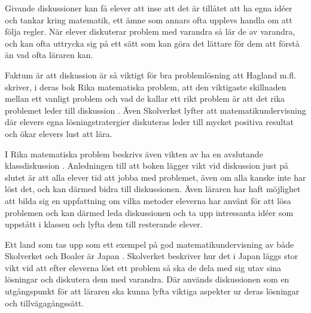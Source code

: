 \textcolor{turkos} {
Givande diskussioner kan få elever att inse att det är tillåtet att ha egna idéer och tankar kring matematik, ett ämne som annars ofta upplevs handla om att följa regler. När elever diskuterar problem med varandra så lär de av varandra, och kan ofta uttrycka sig på ett sätt som kan göra det lättare för dem att förstå än vad ofta läraren kan. \cite{TheElephant}
}

\textcolor{turkos} {Faktum är att diskussion är så viktigt för bra problemlösning att Hagland m.fl. skriver, i deras bok Rika matematiska problem, att den viktigaste skillnaden mellan ett vanligt problem och vad de kallar ett rikt problem är att det rika problemet leder till diskussion \cite{RikaProblem}. Även Skolverket lyfter att matematikundervisning där elevers egna lösningstratergier diskuteras leder till mycket positiva resultat och ökar elevers lust att lära\cite{Skolverket03}.}

\textcolor{turkos}{I Rika matematiska problem beskrivs även vikten av ha en avslutande klassdiskussion \cite{RikaProblem}. Anledningen till att boken lägger vikt vid diskussion just på slutet är att alla elever tid att jobba med problemet, även om alla kanske inte har löst det, och kan därmed bidra till diskussionen. Även läraren har haft möjlighet att bilda sig en uppfattning om vilka metoder eleverna har använt för att lösa problemen och kan därmed leda diskussionen och ta upp intressanta idéer som uppstått i klassen och lyfta dem till resterande elever.}

\textcolor{turkos} {
Ett land som tas upp som ett exempel på god matematikundervisning av både Skolverket och Boaler är Japan \cite{TheElephant}\cite{Skolverket03}. Skolverket beskriver hur det i Japan läggs stor vikt vid att efter eleverna löst ett problem så ska de dela med sig utav sina lösningar och diskutera dem med varandra. Där används diskussionen som en utgångspunkt för att läraren ska kunna lyfta viktiga aspekter ur deras lösningar och tillvägagångssätt.}







